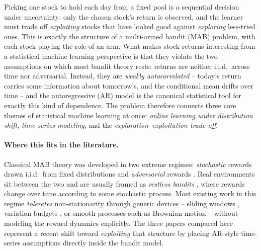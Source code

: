 \documentclass[11pt]{article}
\begin{document}
Picking one stock to hold each day from a fixed pool is a sequential decision under uncertainty: only the chosen stock's return is observed, and the learner must trade off \emph{exploiting} stocks that have looked good against \emph{exploring} less-tried ones. This is exactly the structure of a multi-armed bandit (MAB) problem, with each stock playing the role of an arm. What makes stock returns interesting from a statistical machine learning perspective is that they violate the two assumptions on which most bandit theory rests: returns are neither i.i.d.\ across time nor adversarial. Instead, they are \emph{weakly autocorrelated} -- today's return carries some information about tomorrow's, and the conditional mean drifts over time -- and the autoregressive (AR) model is the canonical statistical tool for exactly this kind of dependence. The problem therefore connects three core themes of statistical machine learning at once: \emph{online learning under distribution shift}, \emph{time-series modeling}, and the \emph{exploration--exploitation trade-off}.
 
\paragraph{Where this fits in the literature.}
Classical MAB theory was developed in two extreme regimes: \emph{stochastic} rewards drawn i.i.d.\ from fixed distributions \citep{lai1985,auer2002ucb} and \emph{adversarial} rewards \citep{auer2002exp3}. Real environments sit between the two and are usually framed as \emph{restless bandits} \citep{whittle1988,ortner2012}, where rewards change over time according to some stochastic process. Most existing work in this regime \emph{tolerates} non-stationarity through generic devices -- sliding windows \citep{garivier2011swucb}, variation budgets \citep{besbes2014}, or smooth processes such as Brownian motion \citep{slivkins2008brownian} -- without modeling the reward dynamics explicitly. The three papers compared here represent a recent shift toward \emph{exploiting} that structure by placing AR-style time-series assumptions directly inside the bandit model.

\newpage
\end{document}

